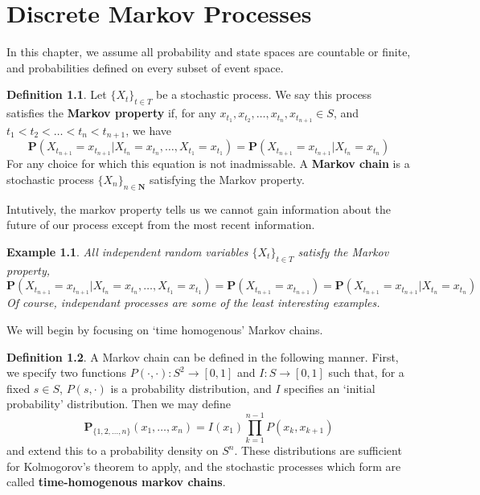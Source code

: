\documentclass[12pt]{report}
\theoremstyle{plain}
\newtheorem*{example}{Example}
\theoremstyle{definition}
\newtheorem*{defi}{Definition}
\newenvironment{definition}
    {\begin{samepage}\begin{framed}\begin{defi}}
    {\end{defi}\end{framed}\end{samepage}}
\begin{document}
\chapter{Discrete Markov Processes}

In this chapter, we assume all probability and state spaces are countable or finite, and probabilities defined on every subset of event space.

\begin{definition}
    Let $\{ X_t \}_{t \in T}$ be a stochastic process. We say this process satisfies the {\bf Markov property} if, for any $x_{t_1}, x_{t_2}, \dots, x_{t_n}, x_{t_{n+1}} \in S$, and $t_1 < t_2 < \dots < t_n < t_{n+1}$, we have
    \[ \mathbf{P}(X_{t_{n+1}} = x_{t_{n+1}} | X_{t_n} = x_{t_n}, \dots, X_{t_1} = x_{t_1}) = \mathbf{P}(X_{t_{n+1}} = x_{t_{n+1}} | X_{t_n} = x_{t_n}) \]
    For any choice for which this equation is not inadmissable. A {\bf Markov chain} is a stochastic process $\{ X_n \}_{n \in \mathbf{N}}$ satisfying the Markov property.
\end{definition}

Intutively, the markov property tells us we cannot gain information about the future of our process except from the most recent information.

\begin{example}
    All independent random variables $\{ X_t \}_{t \in T}$ satisfy the Markov property,
    \[ \mathbf{P}(X_{t_{n+1}} = x_{t_{n+1}} | X_{t_n} = x_{t_n}, \dots, X_{t_1} = x_{t_1}) = \mathbf{P}(X_{t_{n+1}} = x_{t_{n+1}}) = \mathbf{P}(X_{t_{n+1}} = x_{t_{n+1}} | X_{t_n} = x_{t_n}) \]
    Of course, independant processes are some of the least interesting examples.
\end{example}

We will begin by focusing on `time homogenous' Markov chains.

\begin{definition}
    A Markov chain can be defined in the following manner. First, we specify two functions $P(\cdotp,\cdotp):S^2 \to [0,1]$ and $I: S \to [0,1]$ such that, for a fixed $s \in S$, $P(s,\cdot)$ is a probability distribution, and $I$ specifies an `initial probability' distribution. Then we may define
    \[ \mathbf{P}_{\{1, 2, \dots, n\}}(x_1, \dots, x_n) = I(x_1) \prod_{k = 1}^{n-1} P(x_k,x_{k+1}) \]
    and extend this to a probability density on $S^n$. These distributions are sufficient for Kolmogorov's theorem to apply, and the stochastic processes which form are called {\bf time-homogenous markov chains}.
\end{definition}
\end{document}
